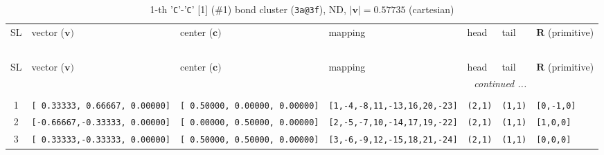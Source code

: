 \documentclass[fleqn,10pt,landscape]{jsarticle}
\begin{document}
\renewcommand{\arraystretch}{1.6}
\begin{longtable}[l]{cllllll}
\captionsetup{justification=raggedright, singlelinecheck=off}
\caption{1-th '\texttt{C}'-'\texttt{C}' [1] (\#1) bond cluster (\texttt{3a@3f}), ND, $|\bm{v}|=0.57735$ (cartesian)}
 \\
 \hline \hline
SL & vector ($\bm{v})$ & center ($\bm{c})$ & mapping & head & tail & $\bm{R}$ (primitive) \\ \hline \endfirsthead

\multicolumn{6}{l}{\tablename\ \thetable{}} \\
 \hline \hline
SL & vector ($\bm{v})$ & center ($\bm{c})$ & mapping & head & tail & $\bm{R}$ (primitive) \\ \hline \endhead

 \hline \hline
\multicolumn{6}{r}{\footnotesize\it continued ...} \\ \endfoot

 \hline \hline
\multicolumn{6}{r}{} \\ \endlastfoot

1 & \texttt{[ 0.33333, 0.66667, 0.00000]} & \texttt{[ 0.50000, 0.00000, 0.00000]} & \texttt{[1,-4,-8,11,-13,16,20,-23]} & \texttt{(2,1)} & \texttt{(1,1)} & \texttt{[0,-1,0]} \\ \hline
2 & \texttt{[-0.66667,-0.33333, 0.00000]} & \texttt{[ 0.00000, 0.50000, 0.00000]} & \texttt{[2,-5,-7,10,-14,17,19,-22]} & \texttt{(2,1)} & \texttt{(1,1)} & \texttt{[1,0,0]} \\ \hline
3 & \texttt{[ 0.33333,-0.33333, 0.00000]} & \texttt{[ 0.50000, 0.50000, 0.00000]} & \texttt{[3,-6,-9,12,-15,18,21,-24]} & \texttt{(2,1)} & \texttt{(1,1)} & \texttt{[0,0,0]} \\
\end{longtable}
\renewcommand{\arraystretch}{1.6}
\end{document}
